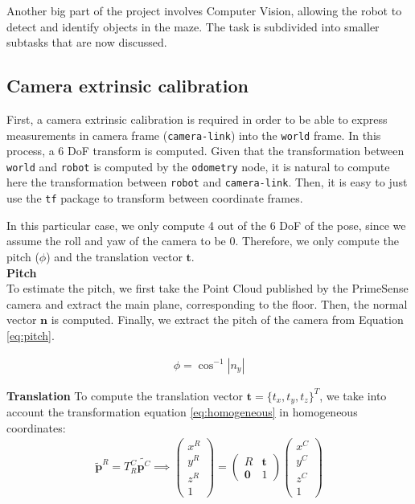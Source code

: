 Another big part of the project involves Computer Vision, allowing the robot to detect and identify objects in the maze. The task is subdivided into smaller subtasks that are now discussed.

\subsection{Camera extrinsic calibration}
First, a camera extrinsic calibration is required in order to be able to express measurements in camera frame (\texttt{camera-link}) into the \texttt{world} frame. In this process, a 6 DoF transform is computed. Given that the transformation between \texttt{world} and \texttt{robot} is computed by the \texttt{odometry} node, it is natural to compute here the transformation between \texttt{robot} and \texttt{camera-link}. Then, it is easy to just use the \texttt{tf} package to transform between coordinate frames.

In this particular case, we only compute 4 out of the 6 DoF of the pose, since we assume the roll and yaw of the camera to be 0. Therefore, we only compute the pitch ($\phi$) and the translation vector $\textbf{t}$.\\
\textbf{Pitch}\\
To estimate the pitch, we first take the Point Cloud published by the PrimeSense camera and extract the main plane, corresponding to the floor. Then, the normal vector $\textbf{n}$ is computed. Finally, we extract the pitch of the camera from Equation \ref{eq:pitch}.

\begin{align}
\label{eq:pitch}
\phi = \cos^{-1}|n_y|
\end{align}

\textbf{Translation}
To compute the translation vector $\textbf{t} = \{t_x, t_y, t_z\}^T$, we take into account the transformation equation \ref{eq:homogeneous} in homogeneous coordinates:
\begin{align}
\label{eq:homogeneous}
\tilde{\textbf{p}}^R = T_{R}^{C} \tilde{\textbf{p}^C}
\implies
\begin{pmatrix}
x^R \\
y^R \\
z^R \\
1
\end{pmatrix}
=
\begin{pmatrix}
R & \textbf{t}\\
\textbf{0} & 1
\end{pmatrix} \begin{pmatrix}
x^C \\
y^C \\
z^C \\
1
\end{pmatrix}
\end{align}

